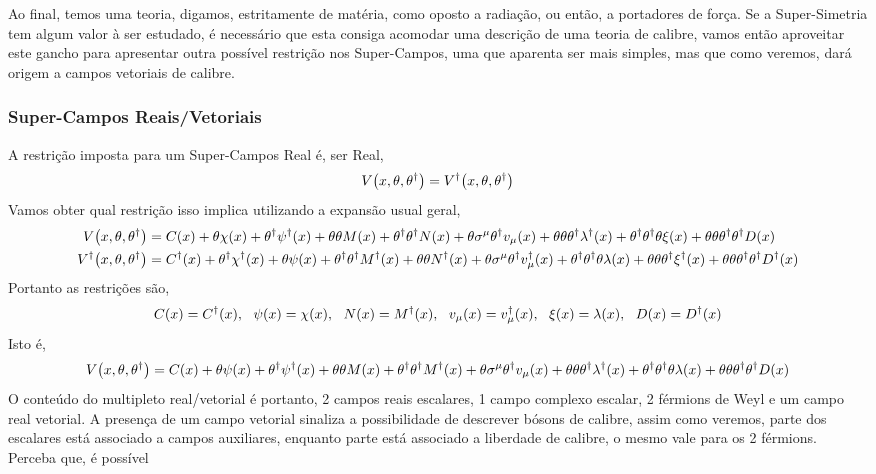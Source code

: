 Ao final, temos uma teoria, digamos, estritamente de matéria, como oposto a radiação, ou então, a portadores de força. Se a Super-Simetria tem algum valor à ser estudado, é necessário que esta consiga acomodar 
uma descrição de uma teoria de calibre, vamos então aproveitar este gancho para apresentar outra possível restrição nos Super-Campos, uma que aparenta ser mais simples, mas que como veremos, dará origem a 
campos vetoriais de calibre.
\subsubsection{Super-Campos Reais/Vetoriais} A restrição imposta para um Super-Campos Real é, ser Real, \[V\qty(x,\theta,\theta^\dagger)=V^\dagger\qty(x,\theta,\theta^\dagger)\] Vamos obter qual restrição isso implica utilizando a expansão usual geral,
\begin{align*}
    V\qty(x,\theta,\theta^\dagger)&=C\qty(x)+\theta\chi\qty(x)+\theta^\dagger\psi^\dagger\qty(x)+\theta\theta M\qty(x)+\theta^\dagger\theta^\dagger N\qty(x)+\theta\sigma^\mu\theta^\dagger v_\mu\qty(x)+\theta\theta\theta^\dagger\lambda^\dagger\qty(x)+\theta^\dagger\theta^\dagger\theta\xi\qty(x)+\theta\theta\theta^\dagger\theta^\dagger D\qty(x)\\
    V^\dagger\qty(x,\theta,\theta^\dagger)&=C^\dagger\qty(x)+\theta^\dagger\chi^\dagger\qty(x)+\theta\psi\qty(x)+\theta^\dagger\theta^\dagger M^\dagger\qty(x)+\theta\theta N^\dagger\qty(x)+\theta\sigma^\mu\theta^\dagger v^\dagger_\mu\qty(x)+\theta^\dagger\theta^\dagger\theta\lambda\qty(x)+\theta\theta\theta^\dagger\xi^\dagger\qty(x)+\theta\theta\theta^\dagger\theta^\dagger D^\dagger\qty(x)
\end{align*}
Portanto as restrições são, \[C\qty(x)=C^\dagger\qty(x),\ \ \psi\qty(x)=\chi\qty(x),\ \ N\qty(x)=M^\dagger\qty(x),\ \ v_\mu\qty(x)=v_\mu^\dagger\qty(x),\ \ \xi\qty(x)=\lambda\qty(x),\ \ D\qty(x)=D^\dagger\qty(x)\] Isto é, 
\[V\qty(x,\theta,\theta^\dagger)=C\qty(x)+\theta\psi\qty(x)+\theta^\dagger\psi^\dagger\qty(x)+\theta\theta M\qty(x)+\theta^\dagger\theta^\dagger M^\dagger\qty(x)+\theta\sigma^\mu\theta^\dagger v_\mu\qty(x)+\theta\theta\theta^\dagger\lambda^\dagger\qty(x)+\theta^\dagger\theta^\dagger\theta\lambda\qty(x)+\theta\theta\theta^\dagger\theta^\dagger D\qty(x)\] O 
conteúdo do multipleto real/vetorial é portanto, 2 campos reais escalares, 1 campo complexo escalar, 2 férmions de Weyl e um campo real vetorial. A presença de um campo vetorial sinaliza a possibilidade de 
descrever bósons de calibre, assim como veremos, parte dos escalares está associado a campos auxiliares, enquanto parte está associado a liberdade de calibre, o mesmo vale para os 2 férmions. Perceba que, é possível 
